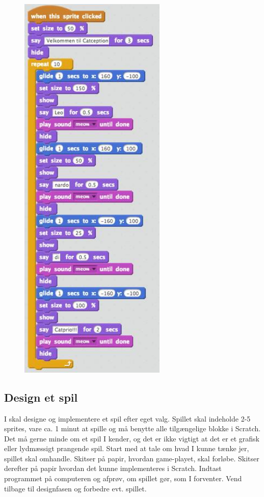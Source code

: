\documentclass[12pt, a4paper, hidelinks]{article}
\begin{document}
\begin{figure}
  \begin{center}
    \includegraphics[width=70mm]{B3.png}
  \end{center}
  \caption{}
  \label{fig:B3}
\end{figure}

\FloatBarrier

\subsection{Design et spil}

I skal designe og implementere et spil efter eget valg. Spillet skal indeholde 2-5
sprites, vare ca. 1 minut at spille og må benytte alle tilgængelige blokke i Scratch.
Det må gerne minde om et spil I kender, og det er ikke vigtigt at det er et grafisk
eller lydmæssigt prangende spil. Start med at tale om hvad I kunne tænke jer,
spillet skal omhandle. Skitser på papir, hvordan game-playet, skal forløbe. Skitser
derefter på papir hvordan det kunne implementeres i Scratch. Indtast programmet
på computeren og afprøv, om spillet gør, som I forventer. Vend tilbage til designfasen
og forbedre evt. spillet.
\end{document}
